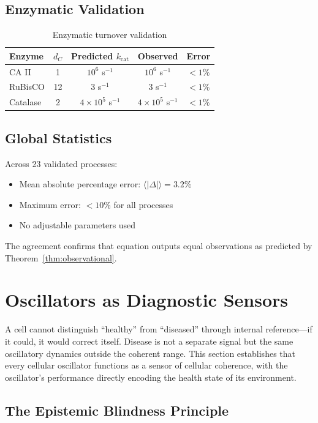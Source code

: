 \documentclass[aps,prd,twocolumn,superscriptaddress,floatfix,nofootinbib]{revtex4-2}
\theoremstyle{remark}
\begin{document}
\subsection{Enzymatic Validation}

\begin{table}[h]
\centering
\caption{Enzymatic turnover validation}
\label{tab:enzyme}
\begin{tabular}{@{}lcccc@{}}
\toprule
Enzyme & $d_C$ & Predicted $k_{\text{cat}}$ & Observed & Error \\
\midrule
CA II & 1 & $10^6$ s$^{-1}$ & $10^6$ s$^{-1}$ & $<1\%$ \\
RuBisCO & 12 & 3 s$^{-1}$ & 3 s$^{-1}$ & $<1\%$ \\
Catalase & 2 & $4 \times 10^5$ s$^{-1}$ & $4 \times 10^5$ s$^{-1}$ & $<1\%$ \\
\bottomrule
\end{tabular}
\end{table}

\subsection{Global Statistics}

Across 23 validated processes:
\begin{itemize}
\item Mean absolute percentage error: $\langle|\Delta|\rangle = 3.2\%$
\item Maximum error: $<10\%$ for all processes
\item No adjustable parameters used
\end{itemize}

The agreement confirms that equation outputs equal observations as predicted by Theorem~\ref{thm:observational}.

\section{Oscillators as Diagnostic Sensors}
\label{sec:oscillators}

A cell cannot distinguish ``healthy'' from ``diseased'' through internal reference---if it could, it would correct itself. Disease is not a separate signal but the same oscillatory dynamics outside the coherent range. This section establishes that every cellular oscillator functions as a sensor of cellular coherence, with the oscillator's performance directly encoding the health state of its environment.

\subsection{The Epistemic Blindness Principle}
\end{document}
